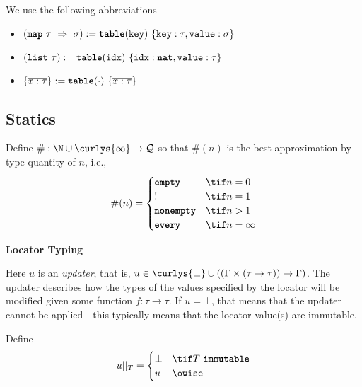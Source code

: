 \documentclass[10pt]{article}
\newcommand{\Loc}{\mathcal{L}}
\newcommand{\tableT}{\textbf{\texttt{table}}\xspace}
\begin{document}
We use the following abbreviations
\begin{itemize}
    \item $(\map~\tau~\Rightarrow~\sigma) := \tableT(\texttt{key})~\{ \texttt{key} : \tau, \texttt{value} : \sigma \}$
    \item $(\listq~\tau) := \tableT(\texttt{idx})~\{ \texttt{idx} : \natt, \texttt{value} : \tau \}$
    \item $\{ \overline{x : \tau} \} := \tableT(\cdot)~\{ \overline{x : \tau} \}$
\end{itemize}


\subsection{Statics}

Define $\# : \N \cup \curlys{\infty} \to \mathcal{Q}$ so that $\#(n)$ is the best approximation by type quantity of $n$, i.e.,
\[
    \#(n) =
    \begin{cases}
        \emptyq & \tif n = 0 \\
        \exactlyone & \tif n = 1 \\
        \nonempty & \tif n > 1 \\
        \every & \tif n = \infty \\
    \end{cases}
\]

\framebox{$\Gamma \flowproves (\Loc : \tau) ; u$} \textbf{Locator Typing}

Here $u$ is an \emph{updater}, that is, $u \in \curlys{\bot} \cup ((\Gamma \times (\tau \to \tau)) \to \Gamma)$.
The updater describes how the types of the values specified by the locator will be modified given some function $f : \tau \to \tau$.
If $u = \bot$, that means that the updater cannot be applied---this typically  means that the locator value(s) are immutable.

Define
\[
    u ||_T =
    \begin{cases}
        \bot & \tif T~\immutable \\
        u & \owise
    \end{cases}
\]

\begin{mathpar}

\end{mathpar}
\end{document}
